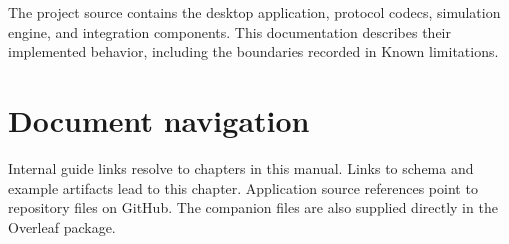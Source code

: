 The project source contains the desktop application, protocol codecs, simulation engine, and integration components. This documentation describes their implemented behavior, including the boundaries recorded in Known limitations.

\section*{Document navigation}
Internal guide links resolve to chapters in this manual. Links to schema and example artifacts lead to this chapter. Application source references point to repository files on GitHub. The companion files are also supplied directly in the Overleaf package.
